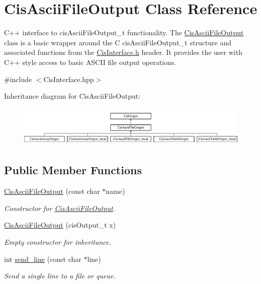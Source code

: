 \hypertarget{classCisAsciiFileOutput}{}\section{Cis\+Ascii\+File\+Output Class Reference}
\label{classCisAsciiFileOutput}


C++ interface to cis\+Ascii\+File\+Output\+\_\+t functionality. The \mbox{\hyperlink{classCisAsciiFileOutput}{Cis\+Ascii\+File\+Output}} class is a basic wrapper around the C cis\+Ascii\+File\+Output\+\_\+t structure and associated functions from the \mbox{\hyperlink{CisInterface_8h_source}{Cis\+Interface.\+h}} header. It provides the user with C++ style access to basic A\+S\+C\+II file output operations.  




{\ttfamily \#include $<$Cis\+Interface.\+hpp$>$}

Inheritance diagram for Cis\+Ascii\+File\+Output\+:\begin{figure}[H]
\begin{center}
\leavevmode
\includegraphics[height=1.976471cm]{classCisAsciiFileOutput}
\end{center}
\end{figure}
\subsection*{Public Member Functions}
\begin{DoxyCompactItemize}
\item 
\mbox{\hyperlink{classCisAsciiFileOutput_ab17524610ace98b485e02932ba3468af}{Cis\+Ascii\+File\+Output}} (const char $\ast$name)
\begin{DoxyCompactList}\small\item\em Constructor for \mbox{\hyperlink{classCisAsciiFileOutput}{Cis\+Ascii\+File\+Output}}. \end{DoxyCompactList}\item 
\mbox{\label{classCisAsciiFileOutput_a123f97ab25f1930bc4930e468de1bf05}} 
\mbox{\hyperlink{classCisAsciiFileOutput_a123f97ab25f1930bc4930e468de1bf05}{Cis\+Ascii\+File\+Output}} (cis\+Output\+\_\+t x)
\begin{DoxyCompactList}\small\item\em Empty constructor for inheritance. \end{DoxyCompactList}\item 
int \mbox{\hyperlink{classCisAsciiFileOutput_a8863d020f0cc7c4690fa0877358eae6d}{send\+\_\+line}} (const char $\ast$line)
\begin{DoxyCompactList}\small\item\em Send a single line to a file or queue. \end{DoxyCompactList}\end{DoxyCompactItemize}


